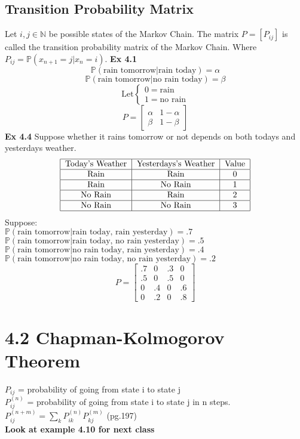 \documentclass{article}
\begin{document}
\subsection*{Transition Probability Matrix}
Let $i,j \in \mathds{N}$ be possible states of the Markov Chain. The matrix $P = [P_{ij}]$ is called the transition probability matrix of the Markov Chain. Where $P_{ij} = \mathds{P}(x_{n+1} = j | x_n = i)$.
\textbf{Ex 4.1}
$$\mathds{P}(\text{rain tomorrow} | \text{rain today}) = \alpha$$
$$\mathds{P}(\text{rain tomorrow} | \text{no rain today}) = \beta$$
$$\text{Let} \begin{cases}
    0 = \text{rain} \\
    1 = \text{no rain}
\end{cases}$$
$$P = \begin{bmatrix}
    \alpha & 1 - \alpha \\
    \beta & 1 - \beta
\end{bmatrix}$$
\textbf{Ex 4.4}
Suppose whether it rains tomorrow or not depends on both todays and yesterdays weather. \\
$$\begin{tabular}{|c|c|c|}
    \hline
    Today's Weather & Yesterdays's Weather & Value \\
    \hline
    Rain & Rain & 0 \\
    \hline
    Rain & No Rain & 1 \\
    \hline
    No Rain & Rain & 2 \\
    \hline
    No Rain & No Rain & 3 \\
    \hline
\end{tabular}$$
Suppose:\\ $\mathds{P}(\text{rain tomorrow} | \text{rain today, rain yesterday}) = .7$\\
$\mathds{P}(\text{rain tomorrow} | \text{rain today, no rain yesterday}) = .5$\\
$\mathds{P}(\text{rain tomorrow} | \text{no rain today, rain yesterday}) = .4$\\
$\mathds{P}(\text{rain tomorrow} | \text{no rain today, no rain yesterday}) = .2$\\
$$P = \begin{bmatrix}
    .7 & 0 & .3 & 0 \\
    .5 & 0 & .5 & 0 \\
    0 & .4 & 0 & .6 \\
    0 & .2 & 0 & .8
\end{bmatrix}$$
\section*{4.2 Chapman-Kolmogorov Theorem}
$P_{ij}$ = probability of going from state i to state j\\
$P_{ij}^{(n)}$ = probability of going from state i to state j in n steps.\\
$P_{ij}^{(n+m)} = \sum_{k} P_{ik}^{(n)} P_{kj}^{(m)}$ (pg.197)\\
\textbf{Look at example 4.10 for next class}
\end{document}

